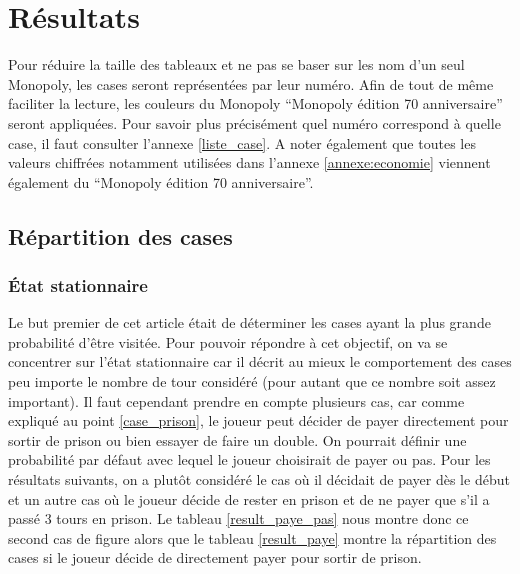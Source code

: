 \documentclass[letterpaper]{article}
\newcommand{\monopolyEditionAnni}{``Monopoly édition 70\up{ème} anniversaire''}
\begin{document}
\section{Résultats}
  Pour réduire la taille des tableaux et ne pas se baser sur les nom d'un seul
  Monopoly, les cases seront représentées par leur numéro.  Afin de tout de même 
  faciliter la lecture, les couleurs du Monopoly \monopolyEditionAnni
  seront appliquées.  Pour savoir plus précisément quel numéro
  correspond à quelle case, il faut consulter l'annexe \ref{liste_case}.  A noter
  également que toutes les valeurs chiffrées notamment utilisées dans l'annexe
  \ref{annexe:economie} viennent également du \monopolyEditionAnni.

  \subsection{Répartition des cases}

    \subsubsection{État stationnaire}
      Le but premier de cet article était de déterminer les cases ayant
      la plus grande probabilité d'être visitée.  Pour pouvoir répondre à
      cet objectif, on va se concentrer sur l'état stationnaire car il décrit
      au mieux le comportement des cases peu importe le nombre de tour considéré
      (pour autant que ce nombre soit assez important).  Il faut cependant
      prendre en compte plusieurs cas, car comme expliqué au point \ref{case_prison}, le
      joueur peut décider de payer directement pour sortir de prison ou bien
      essayer de faire un double.  On pourrait définir une probabilité par défaut
      avec lequel le joueur choisirait de payer ou pas.  Pour les résultats suivants,
      on a plutôt considéré le cas où il décidait de payer dès le début et un autre
      cas où le joueur décide de rester en prison et de ne payer que s'il a passé
      3 tours en prison.  Le tableau \ref{result_paye_pas} nous montre donc ce second
      cas de figure alors que le tableau \ref{result_paye} montre la répartition
      des cases si le joueur décide de directement payer pour sortir de prison.
\end{document}
